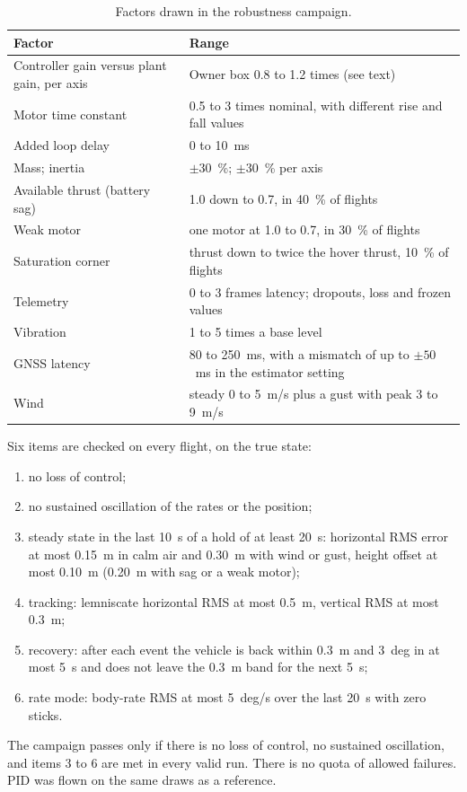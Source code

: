 \begin{table}[tbp]
\caption{Factors drawn in the robustness campaign.}\label{tab:val_g3_factors}
\centering
\small
\begin{tabularx}{\textwidth}{@{}L{5.2cm} Y@{}}
\toprule
Factor & Range \\
\midrule
Controller gain versus plant gain, per axis & Owner box 0.8 to 1.2 times (see text) \\
Motor time constant & 0.5 to 3 times nominal, with different rise and fall values \\
Added loop delay & 0 to 10~ms \\
Mass; inertia & $\pm 30$~\%; $\pm 30$~\% per axis \\
Available thrust (battery sag) & 1.0 down to 0.7, in 40~\% of flights \\
Weak motor & one motor at 1.0 to 0.7, in 30~\% of flights \\
Saturation corner & thrust down to twice the hover thrust, 10~\% of flights \\
Telemetry & 0 to 3 frames latency; dropouts, loss and frozen values \\
Vibration & 1 to 5 times a base level \\
GNSS latency & 80 to 250~ms, with a mismatch of up to $\pm 50$~ms in the estimator setting \\
Wind & steady 0 to 5~m/s plus a gust with peak 3 to 9~m/s \\
\bottomrule
\end{tabularx}
\end{table}

Six items are checked on every flight, on the true state:
\begin{enumerate}
  \item no loss of control;
  \item no sustained oscillation of the rates or the position;
  \item steady state in the last 10~s of a hold of at least 20~s: horizontal RMS error at most 0.15~m in calm air and 0.30~m with wind or gust, height offset at most 0.10~m (0.20~m with sag or a weak motor);
  \item tracking: lemniscate horizontal RMS at most 0.5~m, vertical RMS at most 0.3~m;
  \item recovery: after each event the vehicle is back within 0.3~m and 3~deg in at most 5~s and does not leave the 0.3~m band for the next 5~s;
  \item rate mode: body-rate RMS at most 5~deg/s over the last 20~s with zero sticks.
\end{enumerate}
The campaign passes only if there is no loss of control, no sustained oscillation, and items 3 to 6 are met in every valid run.
There is no quota of allowed failures.
PID was flown on the same draws as a reference.

